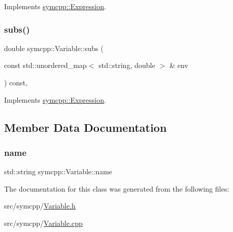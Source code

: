 Implements \mbox{\hyperlink{classsymcpp_1_1Expression_ab1fa6e55eea0682250d013f28db26cd2}{symcpp\+::\+Expression}}.

\mbox{\label{classsymcpp_1_1Variable_a1dfbef67a237aa2533d8dc88c378d08b}} 
\subsubsection{\texorpdfstring{subs()}{subs()}}
{\footnotesize\ttfamily double symcpp\+::\+Variable\+::subs (\begin{DoxyParamCaption}\item[{const std\+::unordered\+\_\+map$<$ std\+::string, double $>$ \&}]{env }\end{DoxyParamCaption}) const\hspace{0.3cm}{\ttfamily [override]}, {\ttfamily [virtual]}}



Implements \mbox{\hyperlink{classsymcpp_1_1Expression_aaef29b0afa2d6c21fe35f47a1be76134}{symcpp\+::\+Expression}}.



\subsection{Member Data Documentation}
\mbox{\label{classsymcpp_1_1Variable_a626cca9e1586e5d60f31446a06c6203f}} 
\subsubsection{\texorpdfstring{name}{name}}
{\footnotesize\ttfamily std\+::string symcpp\+::\+Variable\+::name\hspace{0.3cm}{\ttfamily [private]}}



The documentation for this class was generated from the following files\+:\begin{DoxyCompactItemize}
\item 
src/symcpp/\mbox{\hyperlink{Variable_8h}{Variable.\+h}}\item 
src/symcpp/\mbox{\hyperlink{Variable_8cpp}{Variable.\+cpp}}\end{DoxyCompactItemize}
